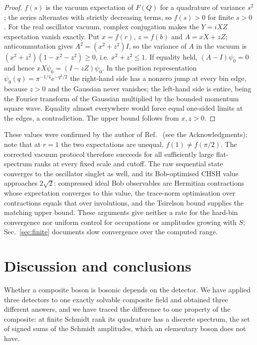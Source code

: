 \documentclass[11pt,a4paper]{article}
\begin{document}
\begin{proof}
$f(s)$ is the vacuum expectation of $F(Q)$ for a quadrature of variance $s^2$; the series alternates with strictly decreasing terms, so $f(s)>0$ for finite $s>0$. For the real oscillator vacuum, complex conjugation makes the $Y=iXZ$ expectation vanish exactly. Put $x=f(r)$, $z=f(b)$ and $A=xX+zZ$; anticommutation gives $A^2=(x^2+z^2)I$, so the variance of $A$ in the vacuum is $(x^2+z^2)(1-x^2-z^2)\ge0$, i.e. $x^2+z^2\le1$. If equality held, $(A-I)\psi_0=0$ and hence $xX\psi_0=(I-zZ)\psi_0$. In the position representation $\psi_0(q)=\pi^{-1/4}e^{-q^2/2}$ the right-hand side has a nonzero jump at every bin edge, because $z>0$ and the Gaussian never vanishes; the left-hand side is entire, being the Fourier transform of the Gaussian multiplied by the bounded momentum square wave. Equality almost everywhere would force equal one-sided limits at the edges, a contradiction. The upper bound follows from $x,z>0$.
\end{proof}

These values were confirmed by the author of Ref.~\cite{Sorella2026} (see the Acknowledgments); note that at $r=1$ the two expectations are unequal, $f(1)\ne f(\pi/2)$. The corrected vacuum protocol therefore succeeds for all sufficiently large flat-spectrum ranks at every fixed scale and cutoff. The raw sequential state converges to the oscillator singlet as well, and its Bob-optimised CHSH value approaches $2\sqrt2$: compressed ideal Bob observables are Hermitian contractions whose expectation converges to this value, the trace-norm optimisation over contractions equals that over involutions, and the Tsirelson bound \cite{Cirelson1980} supplies the matching upper bound. These arguments give neither a rate for the hard-bin convergence nor uniform control for occupations or amplitudes growing with $S$; Sec.~\ref{sec:finite} documents slow convergence over the computed range.

\section{Discussion and conclusions}
\label{sec:conclusion}
Whether a composite boson is bosonic depends on the detector. We have applied three detectors to one exactly solvable composite field and obtained three different answers, and we have traced the difference to one property of the composite: at finite Schmidt rank its quadrature has a discrete spectrum, the set of signed sums of the Schmidt amplitudes, which an elementary boson does not have.
\end{document}
